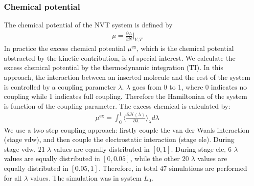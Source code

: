\documentclass[aip,jcp,a4paper,reprint,unsortedaddress,onecolumn,fleqn]{revtex4-1}
\newcommand{\exc}{\textrm{ex}}
\newcommand{\systemla}{L_0}
\begin{document}
\subsubsection{Chemical potential}

The chemical potential of the NVT system is defined by
\begin{align}
  \mu = \frac{\partial A}{\partial N}\Big\vert_{V,T}
\end{align}
In practice the excess chemical potential $\mu^\exc$, which is the
chemical potential abstracted by the kinetic contribution, is of
special interest. We calculate the excess chemical potential by the
thermodynamic integration (TI). In this approach, the interaction
between an inserted molecule and the rest of the system is controlled
by a coupling parameter $\lambda$. $\lambda$ goes from 0 to 1, where 0
indicates no coupling while 1 indicates full coupling. Therefore the
Hamiltonian of the system is function of the coupling parameter. The
excess chemical is calculated by:
\begin{align}
  \mu^\exc = \int_0^1 \Big\langle \frac{\partial \mathcal H(\lambda)}{\partial \lambda} \Big\rangle_\lambda d\lambda
\end{align}
We use a two step coupling approach: firstly couple the van der Waals
interaction (stage vdw), and then couple the electrostatic interaction
(stage ele).  During stage vdw, 21 $\lambda$ values are equally
distributed in $[0,1]$.  During stage ele, 6 $\lambda$ values are
equally distributed in $[0,0.05]$, while the other 20 $\lambda$ values
are equally distributed in $[0.05, 1]$. Therefore, in total 47
simulations are performed for all $\lambda$ values. The simulation was
in system $\systemla$.
\end{document}
